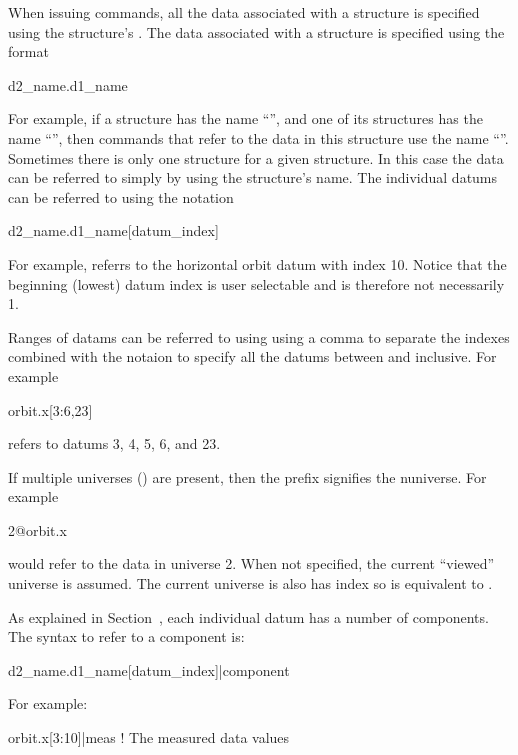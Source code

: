 When issuing \tao commands, all the
data associated with a  structure is specified using the
 structure's .  The data associated with a
 structure is specified using the format
\begin{example}
  d2_name.d1_name
\end{example}
For example, if a  structure has the
name ``'', and one of its  structures has the
name ``'', then \tao commands that refer to the data in this
 structure use the name ``''. Sometimes there
is only one  structure for a given 
structure. In this case the data can be referred to simply by using
the  structure's name. The individual datums can be
referred to using the notation
\begin{example}
  d2_name.d1_name[datum_index]
\end{example}
For example,  referrs to the horizontal orbit datum
with index 10. Notice that the beginning (lowest) datum index is user
selectable and is therefore not necessarily 1.

Ranges of datams can be referred to using using a comma \vn{,} to
separate the indexes combined with the notaion  to specify
all the datums between  and  inclusive. For example
\begin{example}
  orbit.x[3:6,23]
\end{example}
refers to datums 3, 4, 5, 6, and 23. 

If multiple universes () are present, then the prefix
 signifies the n\Th universe. For example
\begin{example}
  2@orbit.x
\end{example}
would refer to the  data in universe 2. When not
specified, the current ``viewed'' universe is assumed. The current
 universe is also has index  so  is
equivalent to .

As explained in Section~, each individual datum
has a number of components. The syntax to refer to a component is:
\begin{example}
  d2_name.d1_name[datum_index]|component
\end{example}
For example:
\begin{example}
  orbit.x[3:10]|meas     ! The measured data values
\end{example}

